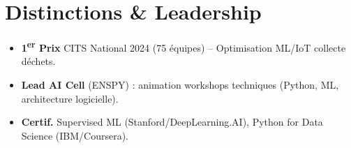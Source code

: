 \documentclass[a4paper,11pt]{article}
\begin{document}
\section{Distinctions \& Leadership}
\begin{itemize}[leftmargin=*, label=\tiny$\bullet$, nosep]
    \item \small{\textbf{1\textsuperscript{er} Prix} CITS National 2024 (75 équipes) -- Optimisation ML/IoT collecte déchets.}
    \item \small{\textbf{Lead AI Cell} (ENSPY) : animation workshops techniques (Python, ML, architecture logicielle).}
    \item \small{\textbf{Certif.} Supervised ML (Stanford/DeepLearning.AI), Python for Data Science (IBM/Coursera).}
\end{itemize}
\end{document}
